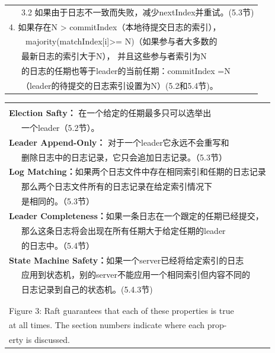 \documentclass[journal]{IEEEtran}
\begin{document}
\begin{table}[htp]
\begin{center}
\begin{tabular}{|p{8.4cm}|}
\ \ \ 3.2 如果由于日志不一致而失败，减少nextIndex并重试。(5.3节) \\
4. 如果存在N > commitIndex（本地待提交日志的索引），\\
\ \ \ \ majority(matchIndex[i]>= N)（如果参与者大多数的\\
\ \ \ 最新日志的索引大于N）， 并且这些参与者索引为N \\
\ \ \ 的日志的任期也等于leader的当前任期：commitIndex =N\\
\ \ \ （leader的待提交的日志索引设置为N）(5.2和5.4节)。\\
\hline
\end{tabular}
\end{center}
\label{default}
\end{table}%

\begin{table}[htp]
\begin{center}
\begin{tabular}{|p{8.4cm}|}
\hline
\\
\textbf{Election Safty：} 在一个给定的任期最多只可以选举出\\
\ \ \ 一个leader（5.2节）。\\
\textbf{Leader Append-Only：} 对于一个leader它永远不会重写和 \\ 
\ \ \ 删除日志中的日志记录，它只会追加日志记录。（5.3节）\\
\textbf{Log Matching：}如果两个日志文件中存在相同索引和任期的日志记录\\
\ \ \ 那么两个日志文件所有的日志记录在给定索引情况下\\
\ \ \ 是相同的。（5.3节）\\
\textbf{Leader Completeness：}如果一条日志在一个跟定的任期已经提交，\\
\ \ \ 那么这条日志将会出现在所有任期大于给定任期的leader\\
\ \ \ 的日志中。（5.4节）\\
\textbf{State Machine Safety：}如果一个server已经将给定索引的日志\\
\ \ \ 应用到状态机，别的server不能应用一个相同索引但内容不同的\\
\ \ \ 日志记录到自己的状态机。(5.4.3节)\\
\\
\hline
\multicolumn{1}{l}{}\\
\multicolumn{1}{l}{Figure 3: Raft guarantees that each of these properties is true}\\
\multicolumn{1}{l}{\qquad at all times. The section numbers indicate where each prop- }\\
\multicolumn{1}{l}{\qquad erty is discussed.}\\
\end{tabular}
\end{center}
\label{default}
\end{table}%
\end{document}
